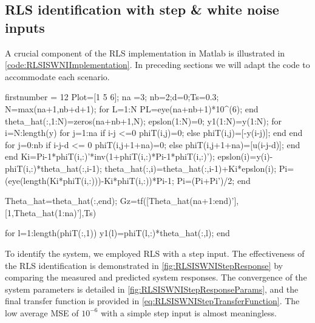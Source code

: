 \FloatBarrier
\subsection{RLS identification with step \& white noise inputs}

A crucial component of the RLS implementation in Matlab is illustrated in \autoref{code:RLSISWNIImplementation}. In preceding sections we will adapt the code to accommodate each scenario.

\begin{code}
	\begin{matlabcode}{firstnumber = 12}
	Plot=[1 5 6];
	na =3; nb=2;d=0;Ts=0.3;
	N=max(na+1,nb+d+1);
	for L=1:N
	P{L}=eye(na+nb+1)*10^(6);
	end
	theta_hat(:,1:N)=zeros(na+nb+1,N);
	epslon(1:N)=0;
	y1(1:N)=y(1:N);
	for i=N:length(y)
	for j=1:na
	if i-j <=0
	phiT(i,j)=0;
	else
	phiT(i,j)=[-y(i-j)];
	end
	end
	for j=0:nb
	if i-j-d <= 0
	phiT(i,j+1+na)=0;
	else
	phiT(i,j+1+na)=[u(i-j-d)];
	end
	end
	K{i}=P{i-1}*phiT(i,:)'*inv(1+phiT(i,:)*P{i-1}*phiT(i,:)');
	epslon(i)=y(i)-phiT(i,:)*theta_hat(:,i-1);
	theta_hat(:,i)=theta_hat(:,i-1)+K{i}*epslon(i);
	P{i}=(eye(length(K{i}*phiT(i,:)))-K{i}*phiT(i,:))*P{i-1};
	P{i}=(P{i}+P{i}')/2;
	end
	
	Theta_hat=theta_hat(:,end);
	Gz=tf([Theta_hat(na+1:end)'],[1,Theta_hat(1:na)'],Ts)
	
	for l=1:length(phiT(:,1))
	y1(l)=phiT(l,:)*theta_hat(:,l);
	end
	\end{matlabcode}
	\label{code:RLSISWNIImplementation}
\end{code}

To identify the system, we employed RLS with a step input. The effectiveness of the RLS identification is demonstrated in \autoref{fig:RLSISWNIStepResponse} by comparing the measured and predicted system responses. The convergence of the system parameters is detailed in \autoref{fig:RLSISWNIStepResponseParams}, and the final transfer function is provided in \autoref{eq:RLSISWNIStepTransferFunction}.  The low average MSE of $10^{-6}$ with a simple step input is almost meaningless.

